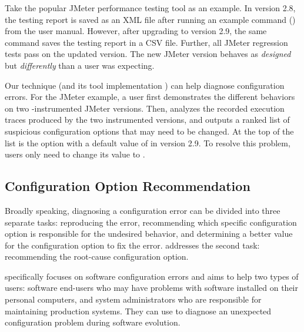 Take the popular JMeter performance testing tool as an example.
In version 2.8, the testing report is saved as an XML
file after running an example command ()
from the user manual.
However, after upgrading to version 2.9, 
the same command saves the testing report
in a CSV file. Further, all JMeter regression tests pass 
on the updated version.  The new JMeter version
behaves as \textit{designed} but \textit{differently}
than a user was expecting.



Our technique (and its tool implementation \ourtool) can help
diagnose configuration errors. For the JMeter example,
a user first demonstrates the different
behaviors on two \ourtool-instrumented
JMeter versions. Then, \ourtool analyzes the
recorded execution traces produced by the two instrumented
versions, and outputs a ranked list of suspicious configuration options
that may need to be changed.
At the top of the list is the
 option with a default value of 
in version 2.9.
To resolve this problem, users only need to change
its value to .


\subsection{Configuration Option Recommendation}

Broadly speaking, diagnosing a configuration
error can be divided into three separate tasks:
reproducing the error, recommending which specific
configuration option is responsible for the undesired
behavior, and determining a better value for the
configuration option to fix the error. \ourtool addresses
the second task: recommending the root-cause configuration option.

\ourtool specifically focuses on software configuration errors and
aims to help two types of users: software end-users
who may have problems with software installed on their
personal computers, and system administrators who are
responsible for maintaining production systems.
They can use \ourtool to diagnose an unexpected configuration
problem during software evolution. 

